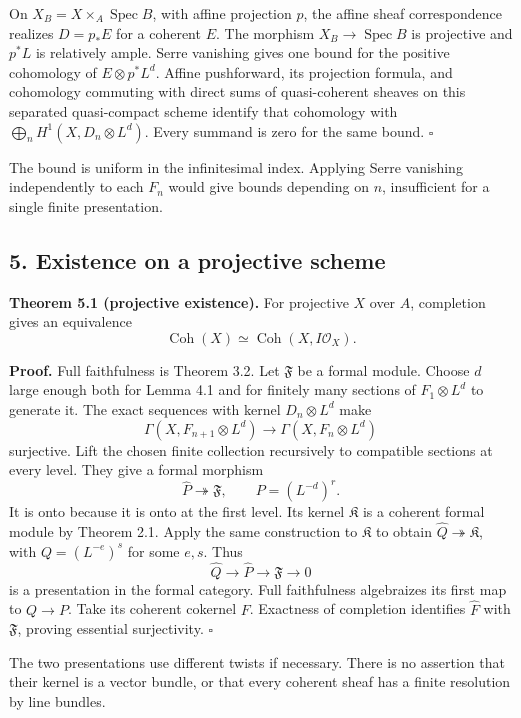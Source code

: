 \documentclass[11pt]{article}
\begin{document}
On \(X_B=X\times_A\operatorname{Spec}B\), with affine projection \(p\),
the affine sheaf correspondence realizes \(D=p_*E\) for a coherent
\(E\). The morphism \(X_B\to\operatorname{Spec}B\) is projective and
\(p^*L\) is relatively ample. Serre vanishing gives one bound for the
positive cohomology of \(E\otimes p^*L^d\). Affine pushforward, its
projection formula, and cohomology commuting with direct sums of
quasi-coherent sheaves on this separated quasi-compact scheme identify
that cohomology with \(\bigoplus_n H^1(X,D_n\otimes L^d)\). Every
summand is zero for the same bound. \(\square\)

The bound is uniform in the infinitesimal index. Applying Serre
vanishing independently to each \(F_n\) would give bounds depending on
\(n\), insufficient for a single finite presentation.

\subsection{5. Existence on a projective
scheme}\label{existence-on-a-projective-scheme}

\textbf{Theorem 5.1 (projective existence).} For projective \(X\) over
\(A\), completion gives an equivalence \[
\operatorname{Coh}(X)\simeq\operatorname{Coh}(X,I\mathcal O_X).
\]

\textbf{Proof.} Full faithfulness is Theorem 3.2. Let \(\mathfrak F\) be
a formal module. Choose \(d\) large enough both for Lemma 4.1 and for
finitely many sections of \(F_1\otimes L^d\) to generate it. The exact
sequences with kernel \(D_n\otimes L^d\) make \[
\Gamma(X,F_{n+1}\otimes L^d)\to\Gamma(X,F_n\otimes L^d)
\] surjective. Lift the chosen finite collection recursively to
compatible sections at every level. They give a formal morphism \[
\widehat P\twoheadrightarrow\mathfrak F,
\qquad P=(L^{-d})^r.
\] It is onto because it is onto at the first level. Its kernel
\(\mathfrak K\) is a coherent formal module by Theorem 2.1. Apply the
same construction to \(\mathfrak K\) to obtain
\(\widehat Q\twoheadrightarrow\mathfrak K\), with \(Q=(L^{-e})^s\) for
some \(e,s\). Thus \[
\widehat Q\longrightarrow\widehat P\longrightarrow\mathfrak F\to0
\] is a presentation in the formal category. Full faithfulness
algebraizes its first map to \(Q\to P\). Take its coherent cokernel
\(F\). Exactness of completion identifies \(\widehat F\) with
\(\mathfrak F\), proving essential surjectivity. \(\square\)

The two presentations use different twists if necessary. There is no
assertion that their kernel is a vector bundle, or that every coherent
sheaf has a finite resolution by line bundles.
\end{document}
